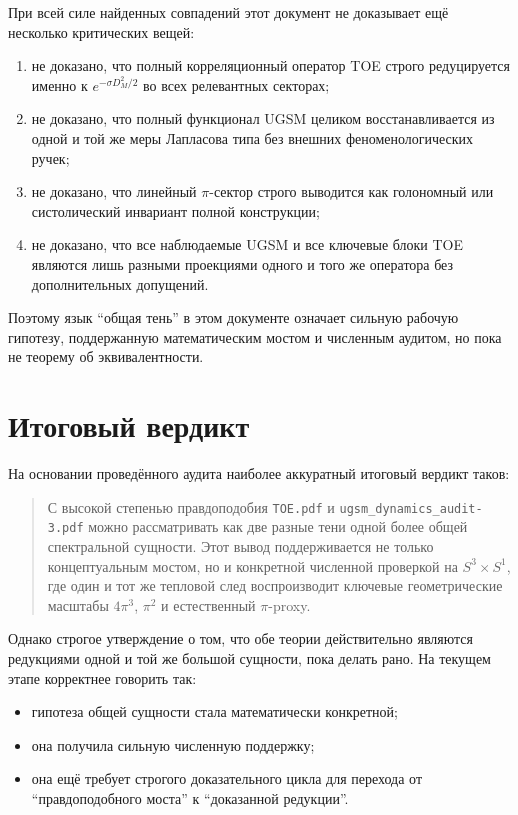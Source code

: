 \documentclass[12pt,a4paper]{article}
\begin{document}
При всей силе найденных совпадений этот документ не доказывает ещё несколько критических вещей:
\begin{enumerate}
    \item не доказано, что полный корреляционный оператор TOE строго редуцируется именно к \(e^{-\sigma D_M^2/2}\) во всех релевантных секторах;
    \item не доказано, что полный функционал UGSM целиком восстанавливается из одной и той же меры Лапласова типа без внешних феноменологических ручек;
    \item не доказано, что линейный \(\pi\)-сектор строго выводится как голономный или систолический инвариант полной конструкции;
    \item не доказано, что все наблюдаемые UGSM и все ключевые блоки TOE являются лишь разными проекциями одного и того же оператора без дополнительных допущений.
\end{enumerate}

Поэтому язык ``общая тень'' в этом документе означает сильную рабочую гипотезу, поддержанную математическим мостом и численным аудитом, но пока не теорему об эквивалентности.

\section{Итоговый вердикт}

На основании проведённого аудита наиболее аккуратный итоговый вердикт таков:

\begin{quote}
С высокой степенью правдоподобия \texttt{TOE.pdf} и \texttt{ugsm\_dynamics\_audit-3.pdf} можно рассматривать как две разные тени одной более общей спектральной сущности. Этот вывод поддерживается не только концептуальным мостом, но и конкретной численной проверкой на \(S^3\times S^1\), где один и тот же тепловой след воспроизводит ключевые геометрические масштабы \(4\pi^3\), \(\pi^2\) и естественный \(\pi\)-proxy.
\end{quote}

Однако строгое утверждение о том, что обе теории действительно являются редукциями одной и той же большой сущности, пока делать рано. На текущем этапе корректнее говорить так:
\begin{itemize}
    \item гипотеза общей сущности стала математически конкретной;
    \item она получила сильную численную поддержку;
    \item она ещё требует строгого доказательного цикла для перехода от ``правдоподобного моста'' к ``доказанной редукции''.
\end{itemize}
\end{document}
